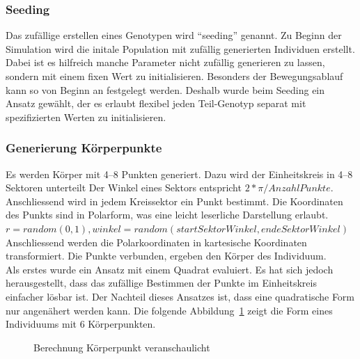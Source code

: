       \subsubsection{Seeding\label{subsub:GenotypeSeeding}}

        Das zufällige erstellen eines Genotypen wird ``seeding'' genannt.
        Zu Beginn der Simulation wird die initale Population mit zufällig generierten Individuen erstellt.
        Dabei ist es hilfreich manche Parameter nicht zufällig generieren zu lassen,
        sondern mit einem fixen Wert zu initialisieren.
        Besonders der Bewegungsablauf kann so von Beginn an festgelegt werden.
        Deshalb wurde beim Seeding ein Ansatz gewählt, der es erlaubt flexibel jeden Teil-Genotyp separat mit
        spezifizierten Werten zu initialisieren.

      \subsubsection{Generierung Körperpunkte\label{subsub:GenotypGenerierungKörperpunkte}}

        Es werden Körper mit 4--8 Punkten generiert.
        Dazu wird der Einheitskreis in 4--8 Sektoren unterteilt
        Der Winkel eines Sektors entspricht \( 2 * \pi / Anzahl Punkte\).
        \\
        Anschliessend wird in jedem Kreissektor ein Punkt bestimmt.
        Die Koordinaten des Punkts sind in Polarform, was eine leicht leserliche Darstellung erlaubt.
        \\
        \( r = random (0, 1), winkel = random(startSektorWinkel, endeSektorWinkel) \)
        Anschliessend werden die Polarkoordinaten in kartesische Koordinaten transformiert.
        Die Punkte verbunden, ergeben den Körper des Individuum.
        \\
        Als erstes wurde ein Ansatz mit einem Quadrat evaluiert.
        Es hat sich jedoch herausgestellt,
        dass das zufällige Bestimmen der Punkte im Einheitskreis einfacher lösbar ist.
        Der Nachteil dieses Ansatzes ist, dass eine quadratische Form nur angenähert werden kann.
        Die folgende Abbildung~\ref{fig:kp} zeigt die Form eines Individuums mit 6 Körperpunkten.
        \\
        \begin{figure}[H]
          
          \caption{Berechnung Körperpunkt veranschaulicht\label{fig:kp}}
        \end{figure}

